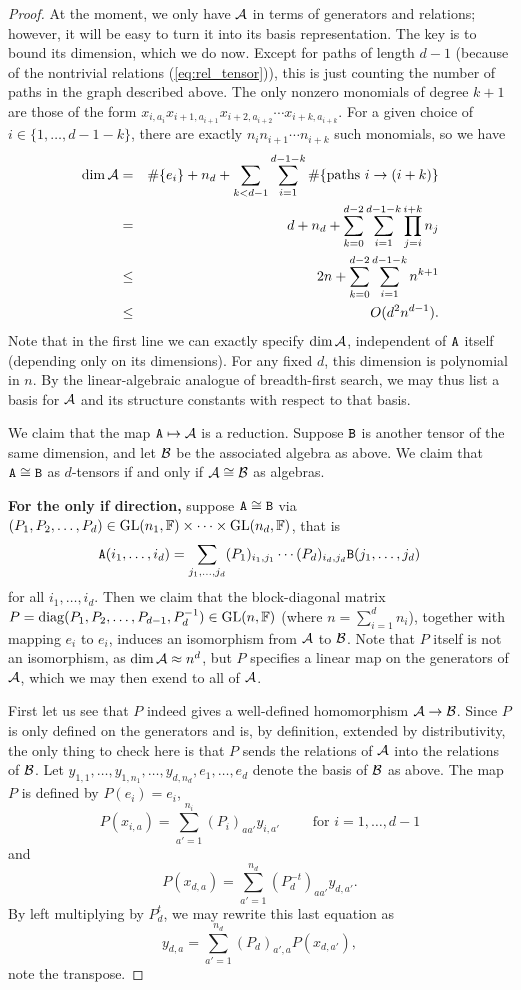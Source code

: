 \documentclass[11pt]{article}
\begin{document}
\begin{proof}
At the moment, we only have $\mathcal{A}$ in terms of generators and relations; however, 
it will be easy to turn it into its basis representation. The key is to bound its 
dimension, which we do now.
Except for paths of length $d-1$ (because of the nontrivial relations (\ref{eq:rel_tensor})), this is just counting the number of paths in the graph described above. The only nonzero monomials of degree $k+1$ are those of the form $x_{i,a_i} x_{i+1,a_{i+1}} x_{i+2, a_{i+2}} \dotsb x_{i+k,a_{i+k}}$. For a given choice of $i \in \{1,\dotsc,d-1-k\}$, there are exactly $n_i n_{i+1} \dotsb n_{i+k}$ such monomials, so we have 
\begin{eqnarray*}
\dim \mathcal{A} & = & \#\{e_i\} + n_d + \sum_{k < d-1} \sum_{i=1}^{d-1-k} \#\{\text{paths } i \to (i+k)\}\\
& = & d + n_d + \sum_{k=0}^{d-2} \sum_{i=1}^{d-1-k} \prod_{j=i}^{i+k} n_j \\
& \leq & 2n + \sum_{k=0}^{d-2} \sum_{i=1}^{d-1-k} n^{k+1} \\
& \leq & O(d^2 n^{d-1}).
\end{eqnarray*}
Note that in the first line we can exactly specify $\dim \mathcal{A}$, independent of $\mathtt{A}$ itself (depending only on its dimensions).
For any fixed $d$, this dimension is polynomial in $n$.
By the linear-algebraic analogue of breadth-first search, we may thus list a basis 
for $\mathcal{A}$ and its structure constants with respect to that basis.

We claim that the map $\mathtt{A} \mapsto \mathcal{A}$ is a reduction. Suppose $\mathtt{B}$ is another tensor of the same dimension, and let $\mathcal{B}$ be the associated algebra as above. We claim that $\mathtt{A} \cong \mathtt{B}$ as $d$-tensors if and only if $\mathcal{A} \cong \mathcal{B}$ as algebras.

\textbf{For the only if direction,} suppose $\mathtt{A} \cong \mathtt{B}$ via $(P_1, P_2, \dotsc, P_d) \in \mathrm{GL}(n_1, \mathbb{F}) \times \dotsb \times \mathrm{GL}(n_d, \mathbb{F})$, that is
\[
\mathtt{A}(i_1, \dotsc, i_d) = \sum_{j_1, \dotsc, j_d} (P_1)_{i_1,j_1} \dotsb (P_d)_{i_d,j_d} \mathtt{B}(j_1, \dotsc, j_d)
\]
for all $i_1, \dotsc, i_d$. Then we claim that the block-diagonal matrix $P = 
\operatorname{diag}(P_1, P_2, \dotsc, P_{d-1}, P_d^{-1}) \in \mathrm{GL}(n,\mathbb{F})$ (where $n=\sum_{i=1}^d 
n_i$), together with mapping $e_i$ to $e_i$, induces an isomorphism from $\mathcal{A}$ to 
$\mathcal{B}$. Note that $P$ itself is not an isomorphism, as $\dim \mathcal{A} \approx n^d$, but 
$P$ specifies a linear map on the generators of $\mathcal{A}$, which we may then 
exend to all of $\mathcal{A}$.

First let us see that $P$ indeed gives a well-defined homomorphism $\mathcal{A} \to \mathcal{B}$. Since $P$ is only defined on the generators and is, by definition, extended by distributivity, the only thing to check here is that $P$ sends the relations of $\mathcal{A}$ into the relations of $\mathcal{B}$. Let $y_{1,1}, \dotsc, y_{1,n_1}, \dotsc, y_{d,n_d}, e_1, \dotsc, e_{d}$ denote the basis of $\mathcal{B}$ as above. The map $P$ is defined by $P(e_i) = e_i$, 
\[
P(x_{i,a}) = \sum_{a'=1}^{n_i} (P_i)_{aa'} y_{i,a'} \qquad \text{ for } i=1,\dotsc,d-1
\]
and
\[
P(x_{d,a}) = \sum_{a'=1}^{n_d} (P_d^{-t})_{aa'} y_{d,a'}.
\]
By left multiplying by $P_d^t$, we may rewrite this last equation as
\[
y_{d,a} = \sum_{a'=1}^{n_d} (P_d)_{a',a} P(x_{d,a'}),
\]
note the transpose.


\end{proof}
\end{document}
